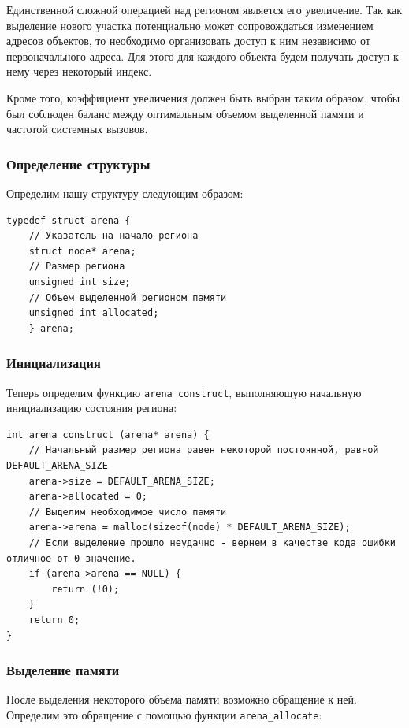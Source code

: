 Единственной сложной операцией над регионом является его увеличение.
Так как выделение нового участка потенциально может сопровождаться изменением
адресов объектов, то необходимо организовать доступ к ним независимо
от первоначального адреса. Для этого для каждого объекта будем получать
доступ к нему через некоторый индекс.

Кроме того, коэффициент увеличения должен быть выбран таким образом, чтобы был
соблюден баланс между оптимальным объемом выделенной
памяти и частотой системных вызовов.

\subsubsection{Определение структуры}
Определим нашу структуру следующим образом:
\begin{verbatim}
typedef struct arena {
    // Указатель на начало региона
    struct node* arena;
    // Размер региона
    unsigned int size;
    // Объем выделенной регионом памяти
    unsigned int allocated;
    } arena;
\end{verbatim}

\subsubsection{Инициализация}
Теперь определим функцию \verb|arena_construct|, выполняющую начальную
инициализацию состояния региона:

\begin{verbatim}
int arena_construct (arena* arena) {
    // Начальный размер региона равен некоторой постоянной, равной DEFAULT_ARENA_SIZE
    arena->size = DEFAULT_ARENA_SIZE;
    arena->allocated = 0;
    // Выделим необходимое число памяти
    arena->arena = malloc(sizeof(node) * DEFAULT_ARENA_SIZE);
    // Если выделение прошло неудачно - вернем в качестве кода ошибки отличное от 0 значение.
    if (arena->arena == NULL) {
        return (!0);
    }
    return 0;
}
\end{verbatim}

\subsubsection{Выделение памяти}
После выделения некоторого объема памяти возможно обращение к ней. Определим
это обращение с помощью функции \verb|arena_allocate|:

